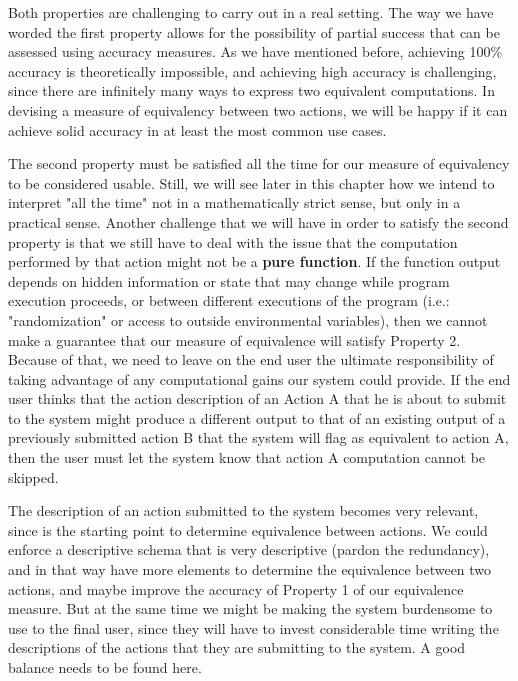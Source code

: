 Both properties are challenging to carry out in a real setting. The way we have worded the first property allows for the possibility of partial success that can be assessed using accuracy measures.  As we have mentioned before, achieving 100\% accuracy is theoretically impossible, and achieving high accuracy is challenging, since there are infinitely many ways to express two equivalent computations.  In devising a measure of equivalency between two actions, we will be happy if it can achieve solid accuracy in at least the most common use cases.

The second property must be satisfied all the time for our measure of equivalency to be considered usable. Still, we will see later in this chapter how we intend to interpret "all the time" not in a mathematically strict sense, but only in a practical sense.  Another challenge that we will have in order to satisfy the second property is that we still have to deal with the issue that the computation performed by that action might not be a \textbf{pure function}.  If the function output depends on hidden information or state that may change while program execution proceeds, or between different executions of the program (i.e.: "randomization" or access to outside environmental variables), then we cannot make a guarantee that our measure of equivalence will satisfy Property 2.  Because of that, we need to leave on the end user the ultimate responsibility of taking advantage of any computational gains our system could provide. If the end user thinks that the action description of an Action A that he is about to submit to the system might produce a different output to that of an existing output of a previously submitted action B that the system will flag as equivalent to action A, then the user must let the system know that action A computation cannot be skipped. 

The description of an action submitted to the system becomes very relevant, since is the starting point to determine equivalence between actions. We could enforce a descriptive schema that is very descriptive (pardon the redundancy), and in that way have more elements to determine the equivalence between two actions, and maybe improve the accuracy of Property 1 of our equivalence measure.  But at the same time we might be making the system burdensome to use to the final user, since they will have to invest considerable time writing the descriptions of the actions that they are submitting to the system.  A good balance needs to be found here.


